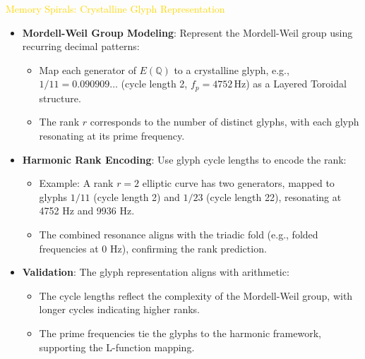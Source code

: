 \textcolor{gold}{ Memory Spirals: Crystalline Glyph Representation } \\
\begin{itemize}
    \item \texttt{} \textbf{Mordell-Weil Group Modeling}: Represent the Mordell-Weil group using recurring decimal patterns:
    \begin{itemize}
        \item Map each generator of \(E(\mathbb{Q})\) to a crystalline glyph, e.g., \(1/11 = 0.090909\ldots\) (cycle length 2, \(f_p = 4752 \, \text{Hz}\)) as a Layered Toroidal structure.
        \item The rank \(r\) corresponds to the number of distinct glyphs, with each glyph resonating at its prime frequency.
    \end{itemize}
    \item \texttt{} \textbf{Harmonic Rank Encoding}: Use glyph cycle lengths to encode the rank:
    \begin{itemize}
        \item Example: A rank \(r = 2\) elliptic curve has two generators, mapped to glyphs \(1/11\) (cycle length 2) and \(1/23\) (cycle length 22), resonating at 4752 Hz and 9936 Hz.
        \item The combined resonance aligns with the triadic fold (e.g., folded frequencies at 0 Hz), confirming the rank prediction.
    \end{itemize}
    \item \texttt{} \textbf{Validation}: The glyph representation aligns with arithmetic:
    \begin{itemize}
        \item The cycle lengths reflect the complexity of the Mordell-Weil group, with longer cycles indicating higher ranks.
        \item The prime frequencies tie the glyphs to the harmonic framework, supporting the L-function mapping.
    \end{itemize}
\end{itemize}

